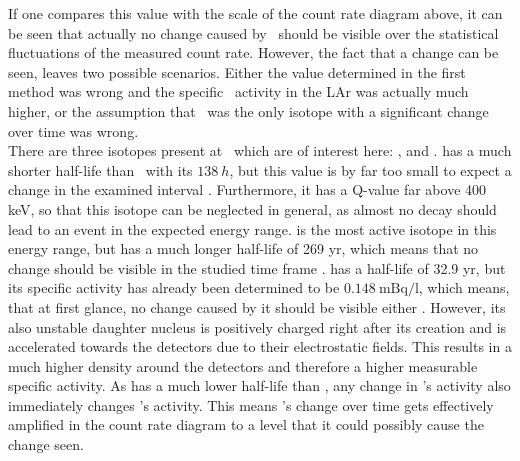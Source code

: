 \documentclass[encoding=utf8,british]{tumphthesis}
\begin{document}
If one compares this value with the scale of the count rate diagram above, it can be seen that actually no change caused by \Kr\ should be visible over the statistical fluctuations of the measured count rate.
However, the fact that a change can be seen, leaves two possible scenarios.
Either the value determined in the first method was wrong and the specific \Kr\ activity in the LAr was actually much higher, or the assumption that \Kr\ was the only isotope with a significant change over time was wrong.
\\

There are three isotopes present at \gerda\ which are of interest here: ,  and .
 has a much shorter half-life than \Kr\ with its $138 \ \unit{h}$, but this value is by far too small to expect a change in the examined interval \cite{kondev_nuclear_2008}. 
Furthermore, it has a Q-value far above 400 keV, so that this isotope can be neglected in general, as almost no decay should lead to an event in the expected energy range. 
 is the most active isotope in this energy range, but has a much longer half-life of 269 yr, which means that no change should be visible in the studied time frame \cite{singh_nuclear_2014}.
 has a half-life of 32.9 yr, but its specific activity has already been determined to be $0.148 \ \mathrm{mBq/l}$, which means, that at first glance, no change caused by it should be visible either \cite{chen_nuclear_2016}.
However, its also unstable daughter nucleus  is positively charged right after its creation and is accelerated towards the detectors due to their electrostatic fields.
This results in a much higher  density around the detectors and therefore a higher measurable specific activity.
As  has a much lower half-life than , any change in 's activity also immediately changes 's activity.
This means 's change over time gets effectively amplified in the count rate diagram to a level that it could possibly cause the change seen.
\\
\end{document}
